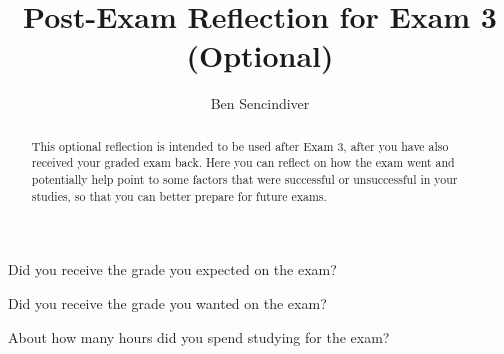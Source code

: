 \documentclass{ximera}
\author{Ben Sencindiver}
\title{Post-Exam Reflection for Exam 3 (Optional)}
\begin{document}
\begin{abstract}
This optional reflection is intended to be used after Exam 3, after you have also received your graded exam back. Here you can reflect on how the exam went and potentially help point to some factors that were successful or unsuccessful in your studies, so that you can better prepare for future exams.
\end{abstract}
\maketitle


\begin{question}
    Did you receive the grade you expected on the exam?

  \begin{multipleChoice}
  \end{multipleChoice}
\end{question}

\begin{question}
    Did you receive the grade you wanted on the exam?

  \begin{multipleChoice}
  \end{multipleChoice}
\end{question}

\begin{question}
  About how many hours did you spend studying for the exam?
  \begin{multipleChoice}
  \end{multipleChoice}
\end{question}
\end{document}
